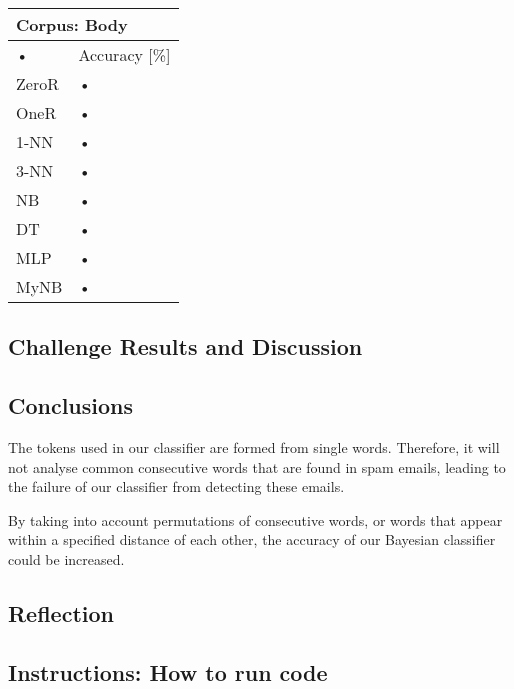 \documentclass[10pt, a4paper]{article}
\begin{document}
\begin{tabular}{|l|l|}
\hline 
\multicolumn{2}{|l|}{Corpus: Body} \\ 
\hline 
• & Accuracy [\%] \\ 
\hline 
ZeroR & • \\ 
\hline 
OneR & • \\ 
\hline 
1-NN & • \\ 
\hline 
3-NN & • \\ 
\hline 
NB & • \\ 
\hline 
DT & • \\ 
\hline 
MLP & • \\ 
\hline 
MyNB & • \\ 
\hline 
\end{tabular} 


\subsection*{Challenge Results and Discussion}

\subsection*{Conclusions}

The tokens used in our classifier are formed from single words. Therefore, it will not analyse common consecutive words that are found in spam emails, leading to the failure of our classifier from detecting these emails. 

By taking into account permutations of consecutive words, or words that appear within a specified distance of each other, the accuracy of our Bayesian classifier could be increased. 

\subsection*{Reflection}

\subsection*{Instructions: How to run code}
\end{document}
